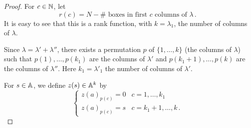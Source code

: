 \documentclass[draft]{article} %
\begin{document}
\begin{proof}
% 
% 
For $ c\in \NN$, let
$$
    r(c) = N - \#\text{~boxes in first $c$ columns of }\lambda\,.
$$
It is easy to see that this is a rank function, with $ k = \lambda_1$, the number of columns of $ \lambda$.

Since $\lambda = \lambda' + \lambda''$, there exists a permutation $ p $ of $ \{1, \dots, k\}$ (the columns of $ \lambda$) such that $ p(1), \dots, p(k_1) $ are the columns of $ \lambda'$ and $ p(k_1+1), \dots, p(k)$ are the columns of $ \lambda''$. Here $ k_1 = \lambda'_1$ the number of columns of $ \lambda'$.

For $ s \in \AA$, we define $ z(s) \in \AA^k$ by 
\[
\begin{cases}
    z(a)_{p(c)} = 0 &  c = 1, \dots, k_1 \\
    z(a)_{p(c)} = s &  c = k_1 + 1, \dots, k\,.
\end{cases}    
\]


\end{proof}
\end{document}
